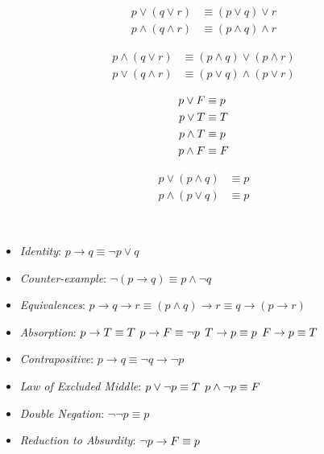 \begin{definition}
\begin{align}
    p \lor (q \lor r) &\equiv (p \lor q) \lor r \\
    p \land (q \land r) &\equiv (p \land q) \land r
\end{align}
\end{definition}

\begin{definition}
\begin{align}
    p \land (q \lor r) &\equiv (p \land q) \lor (p \land r) \\
    p \lor (q \land r) &\equiv (p \lor q) \land (p \lor r)
\end{align}
\end{definition}

\begin{definition}
\begin{align}
    p \lor \relax{F} &\equiv p \\
    p \lor \relax{T} &\equiv \relax{T} \\
    p \land \relax{T} &\equiv p \\
    p \land \relax{F} &\equiv \relax{F}
\end{align}
\end{definition}

\begin{definition}
\begin{align}
    p \lor (p \land q) &\equiv p \\
    p \land (p \lor q) &\equiv p
\end{align}
\end{definition}

\begin{definition}\ \\
\begin{itemize}
    \item \textit{Identity}: $p \to q \equiv \neg p \lor q$
    \item \textit{Counter-example}: $\neg(p \to q) \equiv p \land \neg q$
    \item \textit{Equivalences}: $p \to q \to r \equiv (p \land q) \to r \equiv q \to (p \to r)$
    \item \textit{Absorption}:
        \subitem $p \to \relax{T} \equiv T$
        \subitem $p \to \relax{F} \equiv \neg p$
        \subitem $\relax{T} \to p \equiv p$
        \subitem $\relax{F} \to p \equiv T$
    \item \textit{Contrapositive}: $p \to q \equiv \neg q \to \neg p$
    \item \textit{Law of Excluded Middle}: 
        \subitem $p \lor \neg p \equiv \relax{T}$
        \subitem $p \land \neg p \equiv \relax{F}$
    \item \textit{Double Negation}: $\neg \neg p \equiv p$
    \item \textit{Reduction to Absurdity}: $\neg p \to \relax{F} \equiv p$
\end{itemize}
\end{definition}

